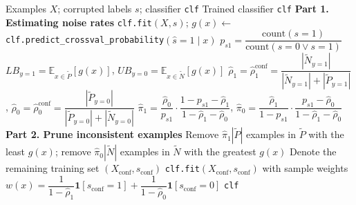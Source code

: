 \documentclass{article}
\begin{document}
\begin{algorithm}[!h]
\renewcommand{\algorithmicrequire}{\textbf{Input:}}
\renewcommand{\algorithmicensure}{\textbf{Output:}}
	\caption{Rank Pruning}
	\begin{algorithmic}[1]
	    \REQUIRE
	    Examples $X$; corrupted labels $s$; classifier \texttt{clf}
	    \ENSURE
	    Trained classifier \texttt{clf}
	    \STATE \textbf{Part 1. Estimating noise rates}
	    \STATE \texttt{clf.fit}$(X,s)$;\quad
	    $g(x)\leftarrow$ \texttt{clf.predict\_crossval\_probability}$(\hat{s}=1\mid x)$ %
	    \STATE $p_{s1}=\dfrac{\mathrm{count}(s=1)}{\mathrm{count}(s=0\vee s=1)}$
	    \STATE $LB_{y=1}=\mathbb{E}_{x\in\tilde{P}}[g(x)]$,\quad
	    $UB_{y=0}=\mathbb{E}_{x\in\tilde{N}}[g(x)]$
	    \STATE $\hat{\rho}_{1}=\hat{\rho}_{1}^{\mathrm{conf}}
	    =\dfrac{|\tilde{N}_{y=1}|}{|\tilde{N}_{y=1}|+|\tilde{P}_{y=1}|}$,\quad
	    $\hat{\rho}_{0}=\hat{\rho}_{0}^{\mathrm{conf}}
	    =\dfrac{|\tilde{P}_{y=0}|}{|\tilde{P}_{y=0}|+|\tilde{N}_{y=0}|}$ %
	    \STATE $\hat{\pi}_{1}=\dfrac{\hat{\rho}_{0}}{p_{s1}}\cdot\dfrac{1-p_{s1}-\hat{\rho}_{1}}{1-\hat{\rho}_{1}-\hat{\rho}_{0}}$,\quad
	    $\hat{\pi}_{0}=\dfrac{\hat{\rho}_{1}}{1-p_{s1}}\cdot\dfrac{p_{s1}-\hat{\rho}_{0}}{1-\hat{\rho}_{1}-\hat{\rho}_{0}}$
	    \STATE \textbf{Part 2. Prune inconsistent examples}
	    \STATE Remove $\hat{\pi}_{1}|\tilde{P}|$ examples in $\tilde{P}$ with the least $g(x)$;
	    remove $\hat{\pi}_{0}|\tilde{N}|$ examples in $\tilde{N}$ with the greatest $g(x)$ %
	    \STATE Denote the remaining training set $(X_{\mathrm{conf}},s_{\mathrm{conf}})$
	    \STATE \texttt{clf.fit}$(X_{\mathrm{conf}},s_{\mathrm{conf}})$ with sample weights
	    $w(x)=\dfrac{1}{1-\hat{\rho}_{1}}\mathbf{1}[s_{\mathrm{conf}}=1]
	    +\dfrac{1}{1-\hat{\rho}_{0}}\mathbf{1}[s_{\mathrm{conf}}=0]$ %
		\RETURN \texttt{clf}
	\end{algorithmic}
\end{algorithm}
\end{document}
